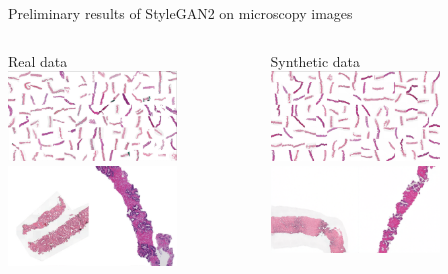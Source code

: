 \documentclass[8pt,xcolor=table,aspectratio=169]{beamer}
\begin{document}
\begin{frame}{Preliminary results of StyleGAN2 on microscopy images}
\begin{columns}
\begin{column}{0.5\textwidth}
\centering
Real data\\
\includegraphics[width=0.7\textwidth]{OlyuTVC.jpg}
\includegraphics[width=0.7\textwidth]{tzfv0KE.png}
\end{column}
\begin{column}{0.5\textwidth}
\centering
Synthetic data\\
\includegraphics[width=0.7\textwidth]{4GxUSWE.jpg}
\includegraphics[width=0.7\textwidth]{DDQ740K.png}


\end{column}
\end{columns}
\end{frame}
\end{document}
